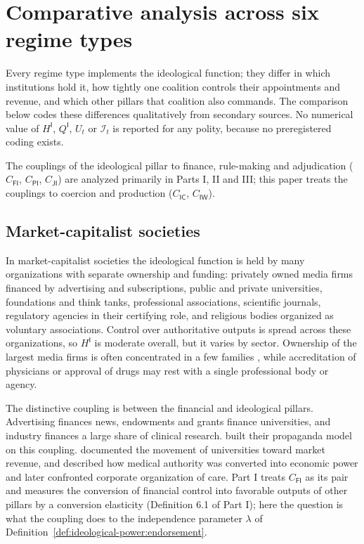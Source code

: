 \documentclass[11pt,letterpaper]{article}
\theoremstyle{definition}
\theoremstyle{remark}
\newcommand{\pF}{\mathsf{F}}
\newcommand{\pP}{\mathsf{P}}
\newcommand{\pJ}{\mathsf{J}}
\newcommand{\pI}{\mathsf{I}}
\newcommand{\pC}{\mathsf{C}}
\newcommand{\pW}{\mathsf{W}}
\newcommand{\Int}{\mathcal{I}}
\begin{document}
\section{Comparative analysis across six regime types}
\label{sec:comparative}

Every regime type implements the ideological function; they differ in which institutions hold it, how tightly one coalition controls their appointments and revenue, and which other pillars that coalition also commands. The comparison below codes these differences qualitatively from secondary sources. No numerical value of $H^{\pI}$, $Q^{\pI}$, $U_t$ or $\Int_t$ is reported for any polity, because no preregistered coding exists.

The couplings of the ideological pillar to finance, rule-making and adjudication ($C_{\pF\pI}$, $C_{\pP\pI}$, $C_{\pJ\pI}$) are analyzed primarily in Parts I, II and III; this paper treats the couplings to coercion and production ($C_{\pI\pC}$, $C_{\pI\pW}$).

\subsection{Market-capitalist societies}

In market-capitalist societies the ideological function is held by many organizations with separate ownership and funding: privately owned media firms financed by advertising and subscriptions, public and private universities, foundations and think tanks, professional associations, scientific journals, regulatory agencies in their certifying role, and religious bodies organized as voluntary associations. Control over authoritative outputs is spread across these organizations, so $H^{\pI}$ is moderate overall, but it varies by sector. Ownership of the largest media firms is often concentrated in a few families \citep{djankov2003}, while accreditation of physicians or approval of drugs may rest with a single professional body or agency.

The distinctive coupling is between the financial and ideological pillars. Advertising finances news, endowments and grants finance universities, and industry finances a large share of clinical research. \citet{herman1988} built their propaganda model on this coupling. \citet{slaughter2004} documented the movement of universities toward market revenue, and \citet{starr1982} described how medical authority was converted into economic power and later confronted corporate organization of care. Part I treats $C_{\pF\pI}$ as its pair and measures the conversion of financial control into favorable outputs of other pillars by a conversion elasticity (Definition 6.1 of Part I); here the question is what the coupling does to the independence parameter $\lambda$ of Definition~\ref{def:ideological-power:endorsement}.
\end{document}
